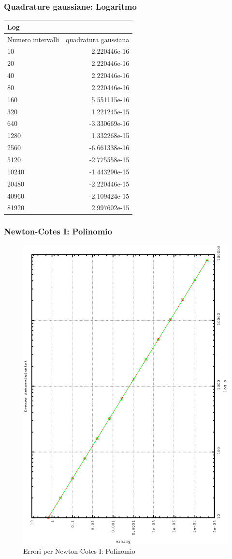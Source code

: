 \subsubsection{Quadrature gaussiane: Logaritmo}
\begin{center}
\begin{longtable}[h]{lr}
\toprule
Log & \\
\midrule
Numero intervalli & quadratura gaussiana \\
10 &	2.220446e-16 \\
20 &	2.220446e-16 \\
40 &	2.220446e-16 \\ 
80 &	2.220446e-16 \\
160 &	5.551115e-16 \\ 
320 & 	1.221245e-15 \\
640 &	-3.330669e-16 \\ 
1280 &	1.332268e-15 \\
2560 &	 -6.661338e-16 \\
5120 &	 -2.775558e-15 \\ 
10240 &	-1.443290e-15 \\ 
20480 &	 -2.220446e-15 \\
40960 &	 -2.109424e-15 \\ 
81920 &	2.997602e-15 \\
\midrule

\bottomrule
\end{longtable}
\end{center}
\subsubsection{Newton-Cotes I: Polinomio}
\begin{figure}[h]
\includegraphics[width=0.7\columnwidth,angle=-90]{plot_trap_poly.eps}
\caption{Errori per Newton-Cotes I: Polinomio}
\end{figure}

